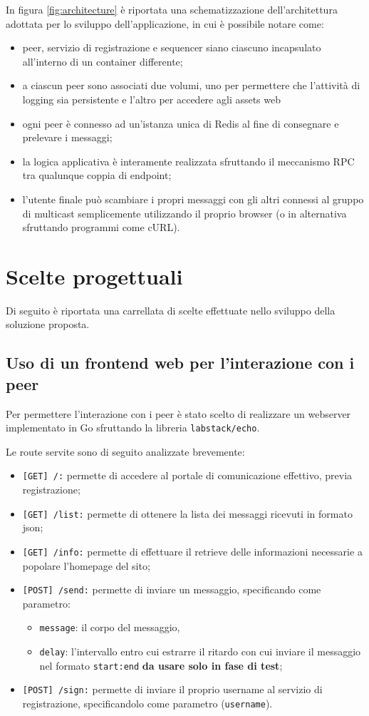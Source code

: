 \documentclass[conference]{IEEEtran}
\begin{document}
In figura \ref{fig:architecture} è riportata una schematizzazione dell'architettura adottata per lo sviluppo dell'applicazione, in cui è possibile notare come:
\begin{itemize}
\item peer, servizio di registrazione e sequencer siano ciascuno incapsulato all'interno di un container differente;
\item a ciascun peer sono associati due volumi, uno per permettere che l'attività di logging sia persistente e l'altro per accedere agli assets web

\item ogni peer è connesso ad un'istanza unica di Redis al fine di consegnare e prelevare i messaggi;

\item la logica applicativa è interamente realizzata sfruttando il meccanismo RPC tra qualunque coppia di endpoint;

\item l'utente finale può scambiare i propri messaggi con gli altri connessi al gruppo di multicast semplicemente utilizzando il proprio browser (o in alternativa sfruttando programmi come cURL). 
\end{itemize}
\section{Scelte progettuali}
Di seguito è riportata una carrellata di scelte effettuate nello sviluppo della soluzione proposta.

\subsection{Uso di un frontend web per l'interazione con i peer}
Per permettere l'interazione con i peer è stato scelto di realizzare un webserver implementato in Go sfruttando la libreria \texttt{labstack/echo}.

Le route servite sono di seguito analizzate brevemente:
\begin{itemize}
\item \texttt{[GET] /:} permette di accedere al portale di comunicazione effettivo, previa registrazione;
\item \texttt{[GET] /list:} permette di ottenere la lista dei messaggi ricevuti in formato json;
\item \texttt{[GET] /info:} permette di effettuare il retrieve delle informazioni necessarie a popolare l'homepage del sito;
\item \texttt{[POST] /send:} permette di inviare un messaggio, specificando come parametro:
\begin{itemize}
\item \texttt{message}: il corpo del messaggio,
\item \texttt{delay}: l'intervallo entro cui estrarre il ritardo con cui inviare il messaggio nel formato \texttt{start:end} \textbf{da usare solo in fase di test};
\end{itemize}
\item \texttt{[POST] /sign:} permette di inviare il proprio username al servizio di registrazione, specificandolo come parametro (\texttt{username}).
\end{itemize}
\end{document}
